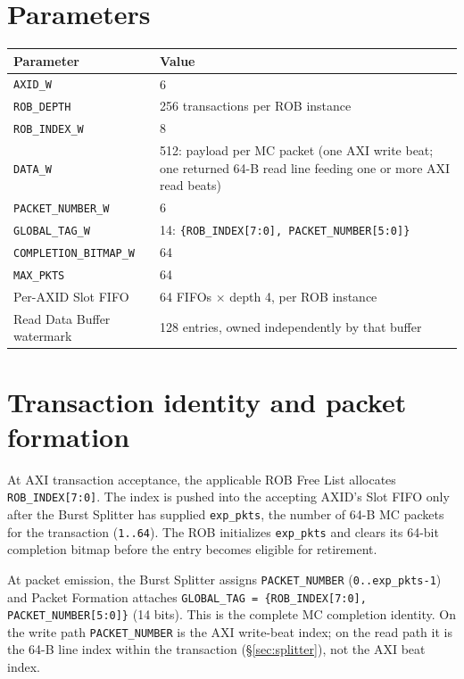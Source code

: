 \section{Parameters}
\begin{center}
\begin{tabular}{ll}
\toprule
\textbf{Parameter} & \textbf{Value}\\
\midrule
\texttt{AXID\_W} & 6\\
\texttt{ROB\_DEPTH} & 256 transactions per ROB instance\\
\texttt{ROB\_INDEX\_W} & 8\\
\texttt{DATA\_W} & 512: payload per MC packet (one AXI write beat; one returned 64-B read line feeding one or more AXI read beats)\\
\texttt{PACKET\_NUMBER\_W} & 6\\
\texttt{GLOBAL\_TAG\_W} & 14: \texttt{\{ROB\_INDEX[7:0], PACKET\_NUMBER[5:0]\}}\\
\texttt{COMPLETION\_BITMAP\_W} & 64\\
\texttt{MAX\_PKTS} & 64\\
Per-AXID Slot FIFO & 64 FIFOs $\times$ depth 4, per ROB instance\\
Read Data Buffer watermark & 128 entries, owned independently by that buffer\\
\bottomrule
\end{tabular}
\end{center}

\section{Transaction identity and packet formation}
\label{sec:identity}

At AXI transaction acceptance, the applicable ROB Free List allocates
\texttt{ROB\_INDEX[7:0]}.  The index is pushed into the accepting AXID's Slot
FIFO only after the Burst Splitter has supplied \texttt{exp\_pkts}, the
number of 64-B MC packets for the transaction (\texttt{1..64}).  The ROB
initializes \texttt{exp\_pkts} and clears its 64-bit completion bitmap
before the entry becomes eligible for retirement.

At packet emission, the Burst Splitter assigns \texttt{PACKET\_NUMBER}
(\texttt{0..exp\_pkts-1}) and Packet Formation attaches
\texttt{GLOBAL\_TAG = \{ROB\_INDEX[7:0], PACKET\_NUMBER[5:0]\}} (14 bits).
This is the complete MC completion identity.  On the write path
\texttt{PACKET\_NUMBER} is the AXI write-beat index; on the read path it is
the 64-B line index within the transaction (\S\ref{sec:splitter}), not the
AXI beat index.

